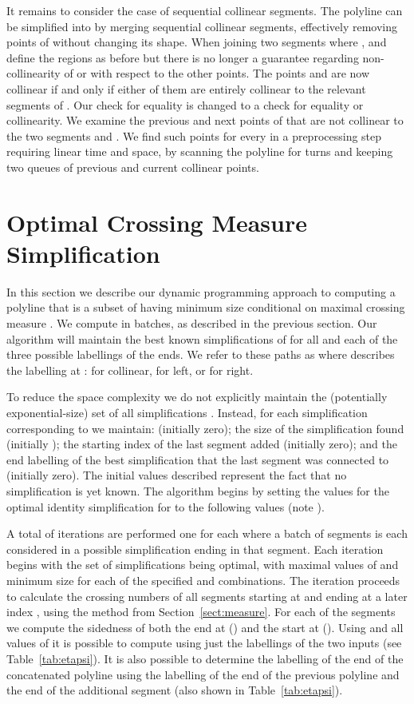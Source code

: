 \documentclass{article}
\begin{document}
It remains to consider the case of sequential collinear segments.  The
polyline  can be simplified into  by merging sequential collinear
segments, effectively removing points of  without changing its shape. 
When joining two segments where ,  and  define
the regions as before but there is no longer a guarantee regarding
non-collinearity of  or  with respect to the other
points.  The points  and  are now collinear if and only if
either of them are entirely collinear to the relevant segments of .  Our
check for equality is changed to a check for equality or collinearity.  We
examine the previous and next points of  that are not collinear to the
two segments  and .  We find such points
for every  in a preprocessing step requiring linear time and space, by
scanning the polyline for turns and keeping two queues of previous and
current collinear points.

\section{Optimal Crossing Measure Simplification}
\label{sect:method}

In this section we describe our dynamic programming approach to computing a
polyline  that is a subset of  having minimum size  conditional on
maximal crossing measure .  We compute  in
batches, as described in the previous section.  Our algorithm will maintain
the best known simplifications of  for all  and each of
the three possible labellings of the ends.  We refer to these paths as
 where  describes the labelling at :
 for collinear,  for left, or  for right.

To reduce the space complexity we do not explicitly maintain the
(potentially exponential-size) set of
all simplifications .  Instead, for each
simplification corresponding to  we maintain:
 (initially zero); the size of the
simplification found  (initially ); the
starting index of the last segment added  (initially
zero); and the end labelling of the best simplification that the last
segment was connected to  (initially zero).  The
initial values described represent the fact that no simplification is yet
known.  The algorithm begins by setting the values for the optimal identity
simplification for  to the following values (note ).

 

A total of  iterations are performed one for each  where a 
batch of segments  is each considered in a possible 
simplification ending in that segment.  Each iteration begins with the 
set of simplifications  being optimal,
with maximal values of  and
minimum size  for each of the specified
 and  combinations.  The iteration proceeds to calculate the
crossing numbers of all segments starting at  and ending at a later
index , using the
method from Section~\ref{sect:measure}.  For each of the segments 
we compute the sidedness of both the end at  () and the start at
 ().  Using  and all values of  it is possible to compute
 using just the labellings of the two
inputs (see Table~\ref{tab:etapsi}).  It is also possible to determine
the labelling of the end of the concatenated polyline
 using the labelling of the end of the previous
polyline  and the end of the additional segment  (also
shown in Table~\ref{tab:etapsi}).
 
\end{document}
